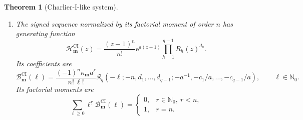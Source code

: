 \documentclass[10pt]{amsart}
\newcommand{\Nzero}{\mathbb N_0}
\newcommand{\e}{\mathrm e}
\newcommand{\mm}{\boldsymbol m}
\newcommand{\fall}[2]{#1^{\underline{#2}}}
\theoremstyle{plain}
\newtheorem{theorem}{Theorem}[section]
\theoremstyle{definition}
\theoremstyle{remark}
\begin{document}
\begin{theorem}[Charlier-I-like system]
\begin{enumerate}[label=\textnormal{(\roman*)}]
\item The signed sequence normalized by its factorial moment of order
\(n\) has generating function
\begin{equation}
 \mathcal H_{\mm}^{\mathrm{CI}}(z)
 =\frac{(z-1)^n}{n!}\e^{a(z-1)}
 \prod_{h=1}^{q-1}R_h(z)^{d_h}.
 \label{eq:CI-B}
\end{equation}
Its coefficients are
\begin{equation}
 \mathcal B_{\mm}^{\mathrm{CI}}(\ell)
 =\frac{(-1)^n\kappa_{\mm}a^\ell}{n!\,\ell!}
 \mathfrak K_q
 \left(
 -\ell;-n,d_1,\ldots,d_{q-1};
 -a^{-1},-c_1/a,\ldots,-c_{q-1}/a
 \right),
 \qquad \ell\in\Nzero.
 \label{eq:CI-B-coefficients}
\end{equation}
Its factorial moments are
\begin{equation}
 \sum_{\ell\ge0}\fall{\ell}{r}\mathcal B_{\mm}^{\mathrm{CI}}(\ell)
 =
 \begin{cases}
  0,&r\in\Nzero,\ r<n,\\
  1,&r=n.
 \end{cases}
 \label{eq:CI-B-moments}
\end{equation}
\end{enumerate}
\end{theorem}
\end{document}
